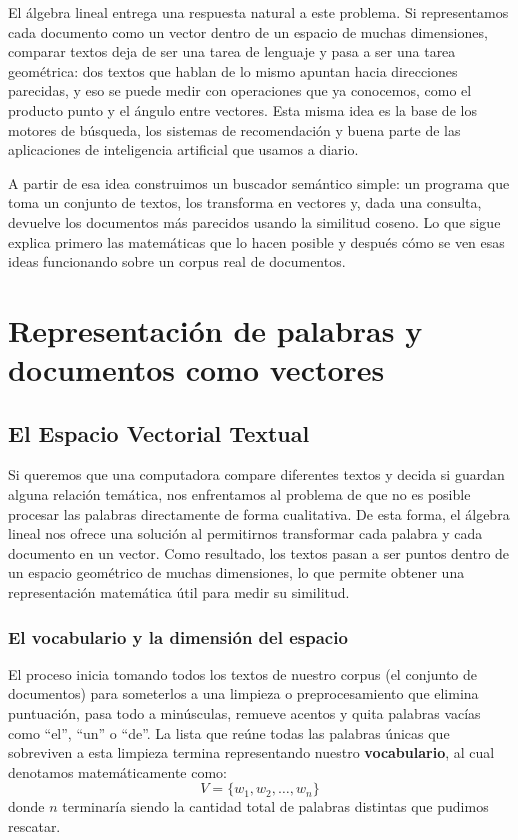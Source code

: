 \documentclass[12pt,a4paper]{article}
\begin{document}
El álgebra lineal entrega una respuesta natural a este problema. Si representamos cada documento como un vector dentro de un espacio de muchas dimensiones, comparar textos deja de ser una tarea de lenguaje y pasa a ser una tarea geométrica: dos textos que hablan de lo mismo apuntan hacia direcciones parecidas, y eso se puede medir con operaciones que ya conocemos, como el producto punto y el ángulo entre vectores. Esta misma idea es la base de los motores de búsqueda, los sistemas de recomendación y buena parte de las aplicaciones de inteligencia artificial que usamos a diario.

A partir de esa idea construimos un buscador semántico simple: un programa que toma un conjunto de textos, los transforma en vectores y, dada una consulta, devuelve los documentos más parecidos usando la similitud coseno. Lo que sigue explica primero las matemáticas que lo hacen posible y después cómo se ven esas ideas funcionando sobre un corpus real de documentos.

\section{Representación de palabras y documentos como vectores}

\subsection{El Espacio Vectorial Textual}

Si queremos que una computadora compare diferentes textos y decida si guardan alguna relación temática, nos enfrentamos al problema de que no es posible procesar las palabras directamente de forma cualitativa. De esta forma, el álgebra lineal nos ofrece una solución al permitirnos transformar cada palabra y cada documento en un vector. Como resultado, los textos pasan a ser puntos dentro de un espacio geométrico de muchas dimensiones, lo que permite obtener una representación matemática útil para medir su similitud.

\subsubsection{El vocabulario y la dimensión del espacio}

El proceso inicia tomando todos los textos de nuestro corpus (el conjunto de documentos) para someterlos a una limpieza o preprocesamiento que elimina puntuación, pasa todo a minúsculas, remueve acentos y quita palabras vacías como ``el'', ``un'' o ``de''. La lista que reúne todas las palabras únicas que sobreviven a esta limpieza termina representando nuestro \textbf{vocabulario}, al cual denotamos matemáticamente como:
\[
V = \{w_1, w_2, \dots, w_n\}
\]
donde $n$ terminaría siendo la cantidad total de palabras distintas que pudimos rescatar.
\end{document}
